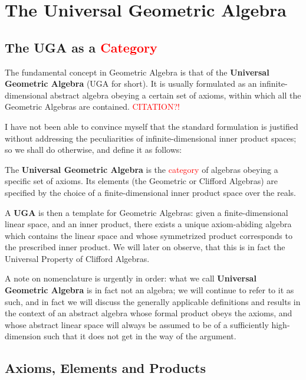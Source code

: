 \section{The Universal Geometric Algebra}
\subsection{The UGA as a \textcolor{red}{Category}}

The fundamental concept in Geometric Algebra is that of the \textbf{Universal Geometric Algebra} (UGA for short). It is usually formulated as an infinite-dimensional abstract algebra obeying a certain set of axioms, within which all the Geometric Algebras are contained. \textcolor{red}{CITATION?!}

I have not been able to convince myself that the standard formulation is justified without addressing the peculiarities of infinite-dimensional inner product spaces; so we shall do otherwise, and define it as follows:
\begin{definition}
	The \textbf{Universal Geometric Algebra} is the \textcolor{red}{category} of algebras obeying a specific set of axioms. Its elements (the Geometric or Clifford Algebras) are specified by the choice of a finite-dimensional inner product space over the reals.
\end{definition}

A \textbf{UGA} is then a template for Geometric Algebras: given a finite-dimensional linear space, and an inner product, there exists a unique axiom-abiding algebra which contains the linear space and whose symmetrized product corresponds to the prescribed inner product. We will later on observe, that this is in fact the Universal Property of Clifford Algebras.

A note on nomenclature is urgently in order: what we call \textbf{Universal Geometric Algebra} is in fact not an algebra; we will continue to refer to it as such, and in fact we will discuss the generally applicable definitions and results in the context of an abstract algebra whose formal product obeys the axioms, and whose abstract linear space will always be assumed to be of a sufficiently high-dimension such that it does not get in the way of the argument.

\subsection{Axioms, Elements and Products}


